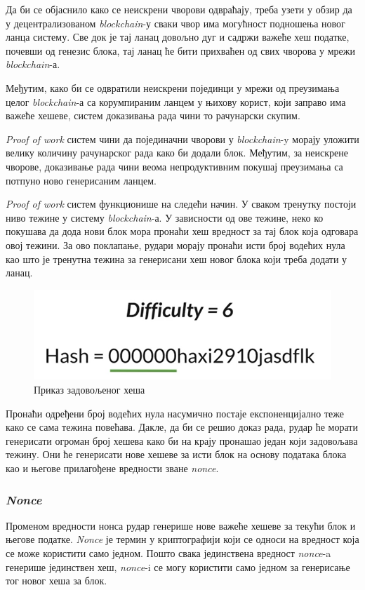 \documentclass[12pt, a4paper]{article}
\begin{document}
Да би се објаснило како се неискрени чворови одвраћају, треба узети у обзир да у децентрализованом \textit{blockchain}-у сваки чвор има могућност подношења новог ланца систему. Све док је тај ланац довољно дуг и садржи важеће хеш податке, почевши од генезис блока, тај ланац ће бити прихваћен од свих чворова у мрежи \textit{blockchain}-а.

Међутим, како би се одвратили неискрени појединци у мрежи од преузимања целог \textit{blockchain}-а са корумпираним ланцем у њихову корист, који заправо има важеће хешеве, систем доказивања рада чини то рачунарски скупим.

\textit{Proof of work} систем чини да појединачни чворови у \textit{blockchain}-y морају уложити велику количину рачунарског рада како би додали блок. Међутим, за неискрене чворове, доказивање рада чини веома непродуктивним покушај преузимања са потпуно ново генерисаним ланцем.

\textit{Proof of work} систем функционише на следећи начин. У сваком тренутку постоји ниво тежине у систему \textit{blockchain}-а. У зависности од ове тежине, неко ко покушава да дода нови блок мора пронаћи хеш вредност за тај блок која одговара овој тежини. За ово поклапање, рудари морају пронаћи исти број водећих нула као што је тренутна тежина за генерисани хеш новог блока који треба додати у ланац.

\begin{figure}[h]
    \centering
    \includegraphics[width=0.5\linewidth]{slike/difficulty.png}
    \caption{Приказ задовољеног хеша}
    \label{fig:good-hash}
\end{figure}

Пронаћи одређени број водећих нула насумично постаје експоненцијално теже како се сама тежина повећава. Дакле, да би се решио доказ рада, рудар ће морати генерисати огроман број хешева како би на крају пронашао један који задовољава тежину. Они ће генерисати нове хешеве за исти блок на основу података блока као и његове прилагођене вредности зване \textit{nonce}.

\subsubsection{\textit{Nonce}}
Променом вредности нонса рудар генерише нове важеће хешеве за текући блок и његове податке. \textit{Nonce} је термин у криптографији који се односи на вредност која се може користити само једном. Пошто свака јединствена вредност \textit{nonce}-a генерише јединствен хеш, \textit{nonce}-i се могу користити само једном за генерисање тог новог хеша за блок.
\end{document}
